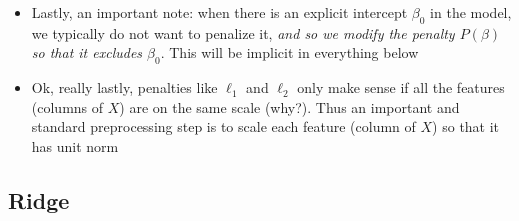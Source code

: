 \documentclass{article}
\begin{document}
\begin{itemize}
\item Lastly, an important note: when there is an explicit intercept $\beta_0$
  in the model, we typically do not want to penalize it, \emph{and so we modify
    the penalty $P(\beta)$ so that it excludes $\beta_0$}. This will be implicit
  in everything below  

\item Ok, really lastly, penalties like $\ell_1$ and $\ell_2$ only make sense if
  all the features (columns of $X$) are on the same scale (why?). Thus an 
  important and standard preprocessing step is to scale each feature (column of
  $X$) so that it has unit norm
\end{itemize}

\subsection{Ridge}
\end{document}
